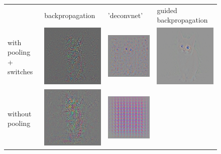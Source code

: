 \documentclass{article} %
\begin{document}
\begin{appendix}
\begin{figure}[h]
\begin{center}
\begin{tabular}{ >{\centering\arraybackslash} m{1.5cm} >{\centering\arraybackslash} m{3.5cm} >{\centering\arraybackslash} m{3.5cm} >{\centering\arraybackslash} m{3.5cm} }
   & backpropagation & 'deconvnet' & guided backpropagation \\
  with pooling + switches & 
  \includegraphics[width=.27\textwidth]{pool4_backprop_max.png} &
  \includegraphics[width=.27\textwidth]{pool4_zeiler_max.png} &
  \includegraphics[width=.27\textwidth]{pool4_tobi_max.png} \\
  without pooling & 
  \includegraphics[width=.27\textwidth]{pool4_backprop_stride.png} &
  \includegraphics[width=.27\textwidth]{pool4_zeiler_stride.png} &

\end{tabular}
\end{center}
\end{figure}
\end{appendix}
\end{document}
